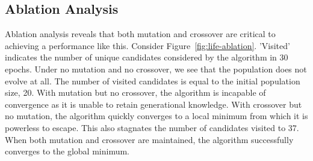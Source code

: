 \subsection{Ablation Analysis}
Ablation analysis reveals that both mutation and crossover are critical to achieving a performance like this. Consider Figure~\ref{fig:life-ablation}. 'Visited' indicates the number of unique candidates considered by the algorithm in 30 epochs. Under no mutation and no crossover, we see that the population does not evolve at all. The number of visited candidates is equal to the initial population size, 20. With mutation but no crossover, the algorithm is incapable of convergence as it is unable to retain generational knowledge. With crossover but no mutation, the algorithm quickly converges to a local minimum from which it is powerless to escape. This also stagnates the number of candidates visited to 37. When both mutation and crossover are maintained, the algorithm successfully converges to the global minimum.\\ 

